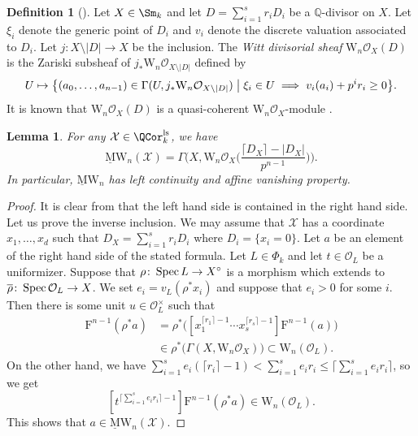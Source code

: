 \documentclass{amsart}
\theoremstyle{plain}
\newtheorem{lemma}[theorem]{Lemma}
\theoremstyle{definition}
\newtheorem{definition}[theorem]{Definition}
\theoremstyle{remark}
\numberwithin{equation}{section}
\def\ceil#1{\lceil #1 \rceil}
\def\ls{\mathrm{ls}}
\def\MW{\underline{\mathrm{M}}\mathrm{W}}
\begin{document}
\begin{definition}[{\cite[Definition 3.1]{Tanaka_Witt}}]
	Let $X\in \Sm_k$ and let $D=\sum_{i=1}^s r_i D_i$ be a $\mathbb{Q}$-divisor on $X$.
	Let $\xi_i$ denote the generic point of $D_i$ and $v_i$ denote the discrete valuation associated to $D_i$.
	Let $j\colon X\setminus|D|\to X$ be the inclusion.
	The \emph{Witt divisorial sheaf} $\mathrm{W}_n\mathcal{O}_X(D)$ is the Zariski subsheaf of $j_*\mathrm{W}_n\mathcal{O}_{X\setminus |D|}$ defined by
	$$
		U\mapsto \bigl\{(a_0,\dots,a_{n-1})\in \Gamma(U, j_*\mathrm{W}_n\mathcal{O}_{X\setminus|D|})\bigm| \xi_i\in U\implies v_i(a_i)+p^i r_i\geq 0\bigr\}.
	$$
	It is known that $\mathrm{W}_n\mathcal{O}_X(D)$ is a quasi-coherent $\mathrm{W}_n\mathcal{O}_X$-module \cite[Lemma 3.5 (2)]{Tanaka_Witt}.
\end{definition}

\begin{lemma}\label{Witt_log_formula}
	For any $\mathcal{X}\in \QCor_k^\ls$, we have
	$$
		\MW_n(\mathcal{X})=\Gamma\biggl(X,\mathrm{W}_n\mathcal{O}_X\biggl(\frac{\ceil{D_X}-|D_X|}{p^{n-1}}\biggr)\biggr).
	$$
	In particular, $\MW_n$ has left continuity and affine vanishing property.
\end{lemma}

\begin{proof}
	It is clear from  that the left hand side is contained in the right hand side.
	Let us prove the inverse inclusion.
	We may assume that $\mathcal{X}$ has a coordinate $x_1,\dots,x_d$ such that $D_X=\sum_{i=1}^s r_i D_i$ where $D_i=\{x_i=0\}$.
	Let $a$ be an element of the right hand side of the stated formula.
	Let $L\in \Phi_k$ and let $t\in \mathcal{O}_L$ be a uniformizer.
	Suppose that $\rho\colon \operatorname{Spec} L\to X^\circ$ is a morphism which extends to $\overline{\rho}\colon \operatorname{Spec} \mathcal{O}_L\to X$.
	We set $e_i=v_L(\rho^*x_i)$ and suppose that $e_i>0$ for some $i$.
	Then there is some unit $u\in \mathcal{O}_L^\times$ such that
	\begin{align*}
		[u t^{\sum_{i=1}^s e_i(\ceil{r_i}-1)}]\mathrm{F}^{n-1}(\rho^*a)&{} = \rho^*\bigl([x_1^{\ceil{r_1}-1}\cdots x_s^{\ceil{r_s}-1}]\mathrm{F}^{n-1}(a)\bigr)\\
		&{} \in \rho^*\bigl(\Gamma(X,\mathrm{W}_n\mathcal{O}_X)\bigr)\subset \mathrm{W}_n(\mathcal{O}_L).
	\end{align*}
	On the other hand, we have $\sum_{i=1}^s e_i(\ceil{r_i}-1)<\sum_{i=1}^s e_i r_i\leq \ceil{\sum_{i=1}^s e_i r_i}$, so we get
	$$
		[t^{\ceil{\sum_{i=1}^s e_i r_i}-1}]\mathrm{F}^{n-1}(\rho^*a) \in \mathrm{W}_n(\mathcal{O}_L).
	$$
	This shows that $a\in \MW_n(\mathcal{X})$.
\end{proof}
\end{document}
